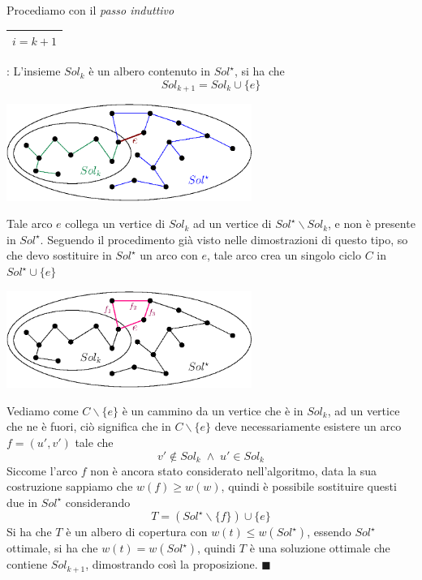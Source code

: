 \documentclass[12pt, letterpaper]{article}
\newcommand{\boxedMath}[1]{\begin{tabular}{|c|}\hline \texttt{#1} \\ \hline\end{tabular} :}
\begin{document}
Procediamo con il \textit{passo induttivo} \boxedMath{$i=k+1$} L'insieme $Sol_k$ è un albero contenuto in $Sol^\star$, si
ha che $$ Sol_{k+1}=Sol_k\cup\{e\}$$
\begin{center}
    \includegraphics[width=0.6\textwidth ]{images/dimPrim1.eps}
\end{center}
Tale arco $e$ collega un vertice di $Sol_k$ ad un vertice di $Sol^\star\backslash Sol_k$, e non è presente in $Sol^\star$.
Seguendo il procedimento già visto nelle dimostrazioni di questo tipo, so che devo sostituire in $Sol^\star$ un arco
con $e$, tale arco crea un singolo ciclo $C$ in $Sol^\star \cup \{e\}$
\begin{center}
    \includegraphics[width=0.6\textwidth ]{images/dimPrim2.eps}
\end{center}
Vediamo come $C\backslash\{e\}$ è un cammino da un vertice che è in $Sol_k$, ad un vertice che ne è fuori, ciò significa
che in $C\backslash\{e\}$ deve necessariamente esistere un arco $f=(u',v')$ tale che $$v'\notin Sol_k\;\land\;u'\in Sol_k$$
Siccome l'arco $f$ non è ancora stato considerato nell'algoritmo, data la sua costruzione sappiamo che $w(f)\ge w(w)$, quindi
è possibile sostituire questi due in $Sol^\star$ considerando
$$ T=(Sol^\star\backslash\{f\})\cup\{e\}$$
Si ha che $T$ è un albero di copertura con $w(t)\le w(Sol^\star)$, essendo $Sol^\star$ ottimale, si ha che
$w(t) = w(Sol^\star)$, quindi $T$ è una soluzione ottimale che contiene $Sol_{k+1}$, dimostrando così la proposizione. $\blacksquare$
\newpage
\end{document}
